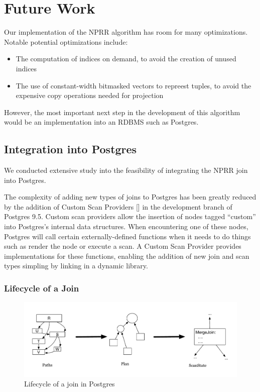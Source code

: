 \section{Future Work}

Our implementation of the NPRR algorithm has room for many
optimizations. Notable potential optimizations include:

\begin{itemize}
\item The computation of indices on demand, to avoid the creation of
  unused indices
\item The use of constant-width bitmasked vectors to repreest tuples,
  to avoid the expensive copy operations needed for projection
\end{itemize}

However, the most important next step in the development of this
algorithm would be an implementation into an RDBMS such as Postgres.

\subsection{Integration into Postgres}

We conducted extensive study into the feasibility of integrating the
NPRR join into Postgres.

The complexity of adding new types of joins to Postgres has been
greatly reduced by the addition of Custom Scan Providers
[\cite{customscan}] in the development branch of Postgres 9.5. Custom
scan providers allow the insertion of nodes tagged ``custom'' into
Postgres's internal data structures. When encountering one of these
nodes, Postgres will call certain externally-defined functions when it
needs to do things such as render the node or execute a scan. A
Custom Scan Provider provides implementations for these functions,
enabling the addition of new join and scan types simpling by linking
in a dynamic library.

\subsubsection{Lifecycle of a Join}

\begin{figure}[h]
\label{fig:join_lifecycle}
\begin{center}
\includegraphics[scale=0.5]{join_lifecycle.pdf}
\end{center}
\caption{Lifecycle of a join in Postgres}
\end{figure}

